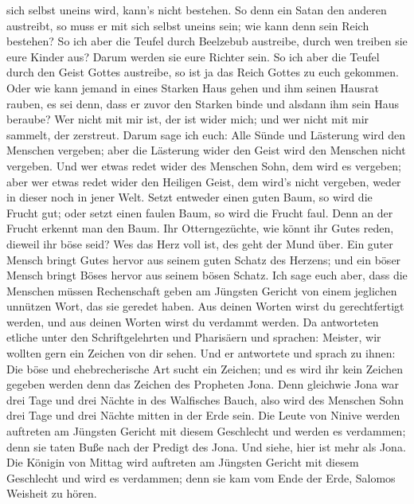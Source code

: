 sich selbst uneins wird, kann's nicht bestehen.  So denn
ein Satan den anderen austreibt, so muss er mit sich selbst uneins sein;
wie kann denn sein Reich bestehen?  So ich aber die Teufel
durch Beelzebub austreibe, durch wen treiben sie eure Kinder aus? Darum
werden sie eure Richter sein.  So ich aber die Teufel durch
den Geist Gottes austreibe, so ist ja das Reich Gottes zu euch gekommen.
 Oder wie kann jemand in eines Starken Haus gehen und ihm
seinen Hausrat rauben, es sei denn, dass er zuvor den Starken binde und
alsdann ihm sein Haus beraube?  Wer nicht mit mir ist, der
ist wider mich; und wer nicht mit mir sammelt, der zerstreut.
 Darum sage ich euch: Alle Sünde und Lästerung wird den
Menschen vergeben; aber die Lästerung wider den Geist wird den Menschen
nicht vergeben.  Und wer etwas redet wider des Menschen
Sohn, dem wird es vergeben; aber wer etwas redet wider den Heiligen
Geist, dem wird's nicht vergeben, weder in dieser noch in jener Welt.
 Setzt entweder einen guten Baum, so wird die Frucht gut;
oder setzt einen faulen Baum, so wird die Frucht faul. Denn an der
Frucht erkennt man den Baum.  Ihr Otterngezüchte, wie könnt
ihr Gutes reden, dieweil ihr böse seid? Wes das Herz voll ist, des geht
der Mund über.  Ein guter Mensch bringt Gutes hervor aus
seinem guten Schatz des Herzens; und ein böser Mensch bringt Böses
hervor aus seinem bösen Schatz.  Ich sage euch aber, dass
die Menschen müssen Rechenschaft geben am Jüngsten Gericht von einem
jeglichen unnützen Wort, das sie geredet haben.  Aus deinen
Worten wirst du gerechtfertigt werden, und aus deinen Worten wirst du
verdammt werden.  Da antworteten etliche unter den
Schriftgelehrten und Pharisäern und sprachen: Meister, wir wollten gern
ein Zeichen von dir sehen.  Und er antwortete und sprach zu
ihnen: Die böse und ehebrecherische Art sucht ein Zeichen; und es wird
ihr kein Zeichen gegeben werden denn das Zeichen des Propheten Jona.
 Denn gleichwie Jona war drei Tage und drei Nächte in des
Walfisches Bauch, also wird des Menschen Sohn drei Tage und drei Nächte
mitten in der Erde sein.  Die Leute von Ninive werden
auftreten am Jüngsten Gericht mit diesem Geschlecht und werden es
verdammen; denn sie taten Buße nach der Predigt des Jona. Und siehe,
hier ist mehr als Jona.  Die Königin von Mittag wird
auftreten am Jüngsten Gericht mit diesem Geschlecht und wird es
verdammen; denn sie kam vom Ende der Erde, Salomos Weisheit zu hören.

